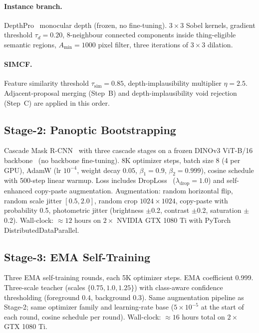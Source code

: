 \documentclass{article}
\begin{document}
\paragraph{Instance branch.}
DepthPro~\cite{bochkovskii2024depthpro} monocular depth (frozen, no fine-tuning). $3\times3$ Sobel kernels, gradient threshold $\tau_d{=}0.20$, 8-neighbour connected components inside thing-eligible semantic regions, $A_\text{min}{=}1000$ pixel filter, three iterations of $3\times3$ dilation.

\paragraph{SIMCF.}
Feature similarity threshold $\tau_\text{sim}{=}0.85$, depth-implausibility multiplier $\eta{=}2.5$. Adjacent-proposal merging (Step~B) and depth-implausibility void rejection (Step~C) are applied in this order.

\subsection{Stage-2: Panoptic Bootstrapping}
\label{sec:supp:impl:stage2}

Cascade Mask R-CNN~\cite{cai2018cascade} with three cascade stages on a frozen DINOv3 ViT-B/16 backbone~\cite{simeoni2025dinov3} (no backbone fine-tuning). 8K optimizer steps, batch size 8 (4 per GPU), AdamW (lr $10^{-4}$, weight decay $0.05$, $\beta_1{=}0.9$, $\beta_2{=}0.999$), cosine schedule with 500-step linear warmup. Loss includes DropLoss~\cite{wang2023cutler} ($\lambda_\text{drop}{=}1.0$) and self-enhanced copy-paste augmentation. Augmentation: random horizontal flip, random scale jitter $[0.5, 2.0]$, random crop $1024\times1024$, copy-paste with probability 0.5, photometric jitter (brightness $\pm$0.2, contrast $\pm$0.2, saturation $\pm$0.2). Wall-clock: $\approx 12$ hours on $2\times$ NVIDIA GTX 1080 Ti with PyTorch DistributedDataParallel.

\subsection{Stage-3: EMA Self-Training}
\label{sec:supp:impl:stage3}

Three EMA self-training rounds, each 5K optimizer steps. EMA coefficient 0.999. Three-scale teacher (scales $\{0.75, 1.0, 1.25\}$) with class-aware confidence thresholding (foreground $0.4$, background $0.3$). Same augmentation pipeline as Stage-2; same optimizer family and learning-rate base ($5\times10^{-5}$ at the start of each round, cosine schedule per round). Wall-clock: $\approx 16$ hours total on $2\times$ GTX 1080 Ti.
\end{document}
